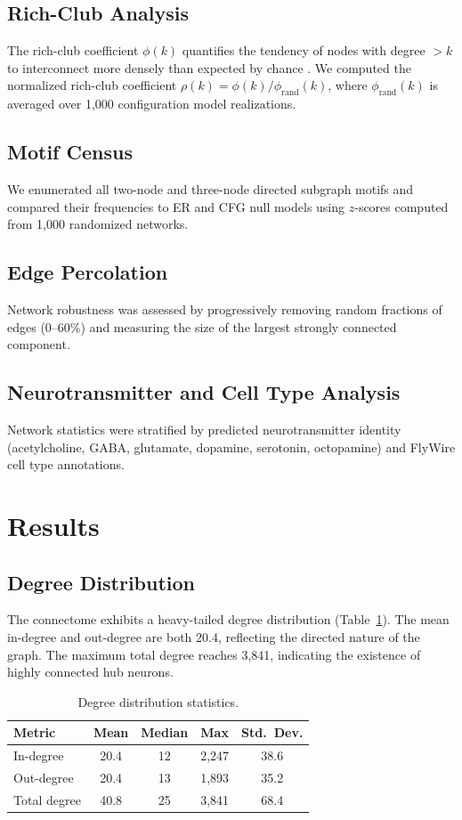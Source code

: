 \documentclass[11pt]{article}
\begin{document}
\subsection{Rich-Club Analysis}
The rich-club coefficient $\phi(k)$ quantifies the tendency of nodes with degree $>k$ to interconnect more densely than expected by chance \citep{colizza2006detecting}. We computed the normalized rich-club coefficient $\rho(k) = \phi(k) / \phi_{\text{rand}}(k)$, where $\phi_{\text{rand}}(k)$ is averaged over 1,000 configuration model realizations.

\subsection{Motif Census}
We enumerated all two-node and three-node directed subgraph motifs and compared their frequencies to ER and CFG null models using $z$-scores computed from 1,000 randomized networks.

\subsection{Edge Percolation}
Network robustness was assessed by progressively removing random fractions of edges (0--60\%) and measuring the size of the largest strongly connected component.

\subsection{Neurotransmitter and Cell Type Analysis}
Network statistics were stratified by predicted neurotransmitter identity (acetylcholine, GABA, glutamate, dopamine, serotonin, octopamine) and FlyWire cell type annotations.

\section{Results}

\subsection{Degree Distribution}
The connectome exhibits a heavy-tailed degree distribution (Table~\ref{tab:degree}). The mean in-degree and out-degree are both 20.4, reflecting the directed nature of the graph. The maximum total degree reaches 3,841, indicating the existence of highly connected hub neurons.

\begin{table}[h]
\centering
\caption{Degree distribution statistics.}
\label{tab:degree}
\begin{tabular}{lcccc}
\toprule
Metric & Mean & Median & Max & Std.\ Dev. \\
\midrule
In-degree & 20.4 & 12 & 2,247 & 38.6 \\
Out-degree & 20.4 & 13 & 1,893 & 35.2 \\
Total degree & 40.8 & 25 & 3,841 & 68.4 \\
\bottomrule
\end{tabular}
\end{table}
\end{document}

